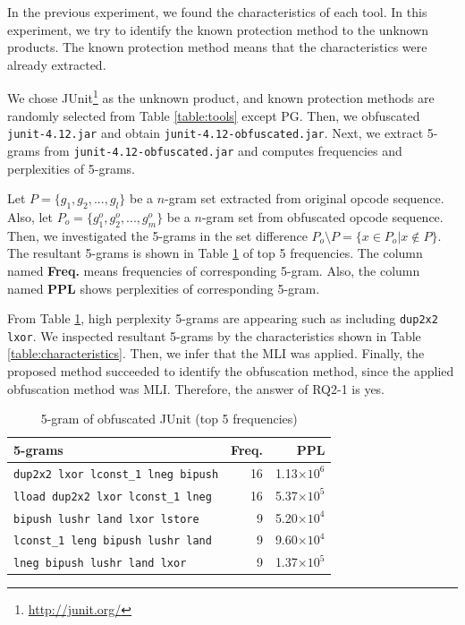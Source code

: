 \documentclass[conference]{IEEEtran}
\begin{document}
In the previous experiment, we found the characteristics of each tool.
In this experiment, we try to identify the known protection method to
the unknown products.  The known protection method means that the
characteristics were already extracted.

We chose JUnit\footnote[5]{\url{http://junit.org/}} as the unknown
product, and known protection methods are randomly selected from Table
\ref{table:tools} except PG.  Then, we obfuscated \texttt{
  junit-4.12.jar} and obtain \texttt{junit-4.12-obfuscated.jar}.
Next, we extract 5-grams from \texttt{junit-4.12-obfuscated.jar} and
computes frequencies and perplexities of 5-grams.

Let $P=\{ g_1, g_2, ..., g_l \}$ be a $n$-gram set extracted from
original opcode sequence.  Also, let $P_o=\{ g^o_1, g^o_2, ..., g^o_m
\}$ be a $n$-gram set from obfuscated opcode sequence.  Then, we
investigated the 5-grams in the set difference $P_o \setminus P = \{ x
\in P_o | x \not\in P \}$.  The resultant 5-grams is shown in Table
\ref{table:junit} of top 5 frequencies.  The column named
\textbf{Freq.} means frequencies of corresponding 5-gram.  Also, the
column named \textbf{PPL} shows perplexities of corresponding 5-gram.

From Table \ref{table:junit}, high perplexity 5-grams are appearing
such as including \texttt{dup2x2 lxor}.  We inspected resultant
5-grams by the characteristics shown in Table
\ref{table:characteristics}.  Then, we infer that the MLI was applied.
Finally, the proposed method succeeded to identify the obfuscation
method, since the applied obfuscation method was MLI.  Therefore, the
answer of RQ2-1 is yes.


\begin{table}[t]
  \centering
  \footnotesize{
    \caption{5-gram of obfuscated JUnit (top 5 frequencies)}\label{table:junit}
  \begin{tabular}{l|r|r}
    \textbf{5-grams} & \textbf{Freq.} & \textbf{PPL}\\ \hline
    \texttt{dup2x2 lxor lconst\_1 lneg bipush}   & 16 & 1.13$\times10^6$ \\
    \texttt{lload dup2x2 lxor lconst\_1 lneg}    & 16 & 5.37$\times10^5$ \\
    \texttt{bipush lushr land lxor lstore}       &  9 & 5.20$\times10^4$ \\
    \texttt{lconst\_1 leng bipush lushr land}    &  9 & 9.60$\times10^4$ \\
    \texttt{lneg bipush lushr land lxor}         &  9 & 1.37$\times10^5$ \\
  \end{tabular}}
\end{table}
\end{document}
